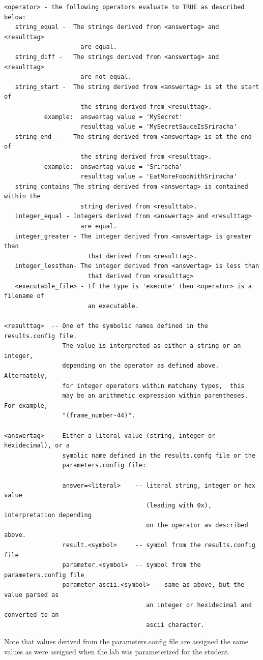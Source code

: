 \documentclass[12pt]{article}
\begin{document}
\begin{verbatim}
<operator> - the following operators evaluate to TRUE as described below:
   string_equal -  The strings derived from <answertag> and <resulttag>
                     are equal.
   string_diff -   The strings derived from <answertag> and <resulttag>
                     are not equal.
   string_start -  The string derived from <answertag> is at the start of 
                     the string derived from <resulttag>.
           example:  answertag value = 'MySecret'
                     resulttag value = 'MySecretSauceIsSriracha'
   string_end -    The string derived from <answertag> is at the end of
                     the string derived from <resulttag>.
           example:  answertag value = 'Sriracha'
                     resulttag value = 'EatMoreFoodWithSriracha'
   string_contains The string derived from <answertag> is contained within the
                     string derived from <resulttab>.
   integer_equal - Integers derived from <answertag> and <resulttag>
                     are equal.
   integer_greater - The integer derived from <answertag> is greater than
                       that derived from <resulttag>.
   integer_lessthan- The integer derived from <answertag> is less than
                       that derived from <resulttag>
   <executable_file> - If the type is 'execute' then <operator> is a filename of 
                       an executable.
             
<resulttag>  -- One of the symbolic names defined in the results.config file.
                The value is interpreted as either a string or an integer,
                depending on the operator as defined above.  Alternately, 
                for integer operators within matchany types,  this
                may be an arithmetic expression within parentheses.  For example,
                "(frame_number-44)".
                
<answertag>  -- Either a literal value (string, integer or hexidecimal), or a 
                symolic name defined in the results.confg file or the 
                parameters.config file:
 
                answer=<literal>    -- literal string, integer or hex value 
                                       (leading with 0x), interpretation depending 
                                       on the operator as described above.
                result.<symbol>     -- symbol from the results.config file
                parameter.<symbol>  -- symbol from the parameters.config file
                parameter_ascii.<symbol> -- same as above, but the value parsed as 
                                       an integer or hexidecimal and converted to an 
                                       ascii character.

\end{verbatim}
         Note that values derived from the parameters.config file are assigned the same values as
         were assigned when the lab was parameterized for the student.
\end{document}
